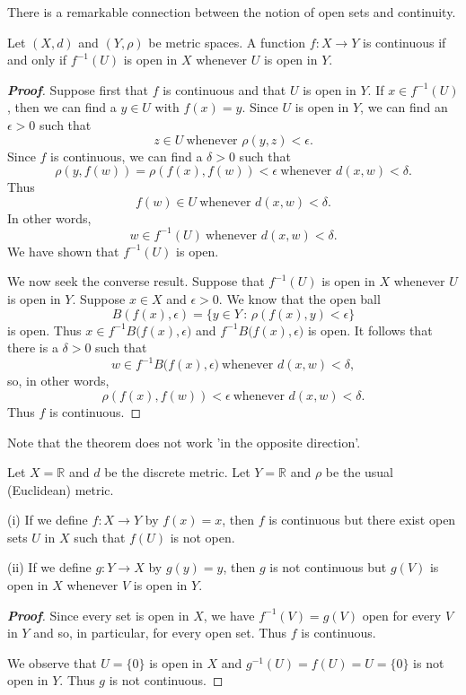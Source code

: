 There is a remarkable connection between the notion of 
open sets and continuity.

\begin{theorem}\label{T;metric continuous open}
Let $(X,d)$ and $(Y,\rho)$ be metric spaces.
A function $f:X\rightarrow Y$ is continuous if and only
if $f^{-1}(U)$ is open in $X$ whenever $U$ is open in $Y$.
\end{theorem}
\begin{proof}[\bf Proof] Suppose first that $f$ is continuous
and that $U$ is open in $Y$. If $x\in f^{-1}(U)$, then
we can find a $y\in U$ with $f(x)=y$. Since $U$ is
open in $Y$, we can find an $\epsilon>0$ such that
\[z\in U\ \text{whenever $\rho(y,z)<\epsilon$}.\]
Since $f$ is continuous, we can find a $\delta>0$
such that
\[\rho(y,f(w))=\rho(f(x),f(w))<\epsilon
\ \text{whenever $d(x,w)<\delta$}.\]
Thus 
\[f(w)\in U\ \text{whenever $d(x,w)<\delta$}.\]
In other words,
\[w\in f^{-1}(U)\ \text{whenever $d(x,w)<\delta$}.\]
We have shown that $f^{-1}(U)$ is open.

We now seek the converse result. Suppose that
$f^{-1}(U)$ is open in $X$ whenever $U$ is open in $Y$.
Suppose $x\in X$ and $\epsilon>0$. We know that the
open ball
\[B(f(x),\epsilon)=\{y\in Y\,:\, \rho(f(x),y)<\epsilon\}\]
is open. Thus
$x\in f^{-1}B\big(f(x),\epsilon\big)$ and
$f^{-1}B\big(f(x),\epsilon\big)$ is open. It follows that
there is a $\delta>0$ such that
\[w\in f^{-1}B\big(f(x),\epsilon\big)\ \text{whenever $d(x,w)<\delta$},\]
so, in other words,
\[\rho(f(x),f(w))<\epsilon\ \text{whenever $d(x,w)<\delta$}.\]
Thus $f$ is continuous.
\end{proof}

Note that the theorem does not work 'in the opposite direction'.

\begin{theorem}\label{T;open not continuous} 
Let $X={\mathbb R}$ and $d$ be the discrete metric. Let $Y={\mathbb R}$ and $\rho$ be the usual (Euclidean) metric.

(i) If we define $f:X\rightarrow Y$ by $f(x)=x$, then $f$ is continuous but there exist open sets $U$ in $X$ such that $f(U)$ is not open.

(ii) If we define $g:Y\rightarrow X$ by $g(y)=y$, then $g$ is not continuous
but $g(V)$ is open in $X$ whenever $V$ is open in $Y$.
\end{theorem}

\begin{proof}[\bf Proof] Since every set is open in $X$, we have
$f^{-1}(V)=g(V)$ open for every $V$ in $Y$ and so, in particular, 
for every open set. Thus $f$ is continuous.

We observe that $U=\{0\}$ is open in $X$ 
and $g^{-1}(U)=f(U)=U=\{0\}$
is not open in $Y$. Thus $g$ is not continuous.
\end{proof}

